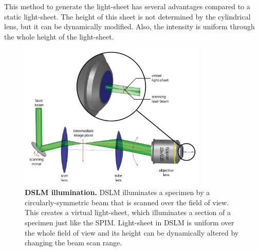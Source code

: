\documentclass{diploma_style}
\begin{document}
This method to generate the light-sheet has several advantages compared to a static light-sheet. The height of this sheet is not determined by the cylindrical lens, but it can be dynamically modified. Also, the intensity is uniform through the whole height of the light-sheet.


\begin{figure}[hb]
	\centering
	\includegraphics[width=0.8\textwidth]{figures/2_spim/dslm}
	\caption{\textbf{DSLM illumination.} DSLM illuminates a specimen by a circularly-symmetric beam that is scanned over the field of view. This creates a virtual light-sheet, which illuminates a section of a specimen just like the SPIM. Light-sheet in DSLM is uniform over the whole field of view and its height can be dynamically altered by changing the beam scan range.
}
	\label{fig:dslm}
\end{figure}
\end{document}
